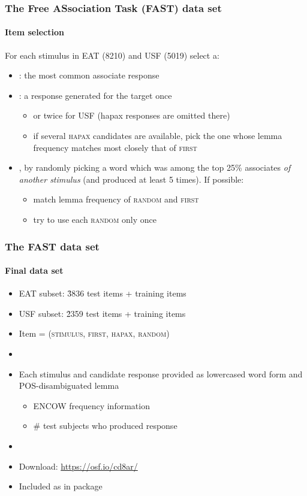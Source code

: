 \documentclass[t]{beamer} %
\begin{document}
\begin{frame}
  \frametitle{The Free ASsociation Task (FAST) data set}
  \framesubtitle{Item selection}

  For each stimulus in EAT (8210) and USF (5019) select a:
  \begin{itemize}
  \item<2-> : the most common associate response
  \item<3-> : a response generated for the target once
    \begin{itemize}
    \item or twice for USF (hapax responses are omitted there)
    \item if several \textsc{hapax} candidates are available, pick the one whose lemma frequency matches most closely that of \textsc{first}
    \end{itemize}	
  \item<4-> , by randomly picking a word which was among the top 25\% associates \textit{of another stimulus} (and produced at least 5 times). If possible: 
    \begin{itemize} 
    \item match lemma frequency of \textsc{random} and \textsc{first}
    \item try to use each \textsc{random} only once
    \end{itemize} 
  \end{itemize}

  \gap[1]
\end{frame}

\begin{frame}
  \frametitle{The FAST data set}
  \framesubtitle{Final data set}


  \begin{itemize}
  \item EAT subset: \h{3836} test items +  training items
  \item USF subset: \h{2359} test items +  training items
  \item Item = (\textsc{stimulus}, \textsc{first}, \textsc{hapax}, \textsc{random})
  \item[]
  \item Each stimulus and candidate response provided as lowercased word form and POS-disambiguated lemma
    \begin{itemize}
    \item[+] ENCOW frequency information
    \item[+] \# test subjects who produced response 
  \end{itemize}
  \item[]
  \item Download: \url{https://osf.io/cd8ar/} \citep{Evert:Lapesa:21}
  \item Included as  in package 
  \end{itemize}
\end{frame}
\end{document}
